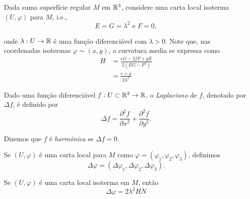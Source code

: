 Dada suma superfície regular $M$ em $\mathbb{R}^3$, considere uma carta local isoterma $(U,\varphi)$ para $M$, i.e., 
\begin{equation*}
	E = G = \lambda^2 \text{ e } F=0,
\end{equation*}

onde $\lambda: U \rightarrow \mathbb{R}$ é uma função diferenciável com $\lambda > 0$. Note que, nas coordenadas isotermas $\varphi \sim (x,y)$, a curvatura media se expressa como
\begin{align*}
	H &= \frac{eG - 2fF + gE}{2(EG - F^2)}\\
	&= \frac{e + g}{2 \lambda^2}
\end{align*}

\begin{defi}
	Dado uma função diferenciável $f: U \subset \mathbb{R}^2 \rightarrow \mathbb{R}$, o \emph{Laplaciano} de $f$, denotado por $\Delta f$, é definido por
	\begin{equation*}
		\Delta f = \frac{\partial^2 f}{\partial x^2} + \frac{\partial^2 f}{\partial y^2}.
	\end{equation*}
	
	Dizemos que $f$ é \emph{harmônica} se $\Delta f = 0$.
	
	Se $(U, \varphi)$ é uma carta local para $M$ como $\varphi = (\varphi_1, \varphi_2, \varphi_3)$, definimos
	\begin{equation*}
		\Delta \varphi = (\Delta \varphi_1, \Delta \varphi_2, \Delta \varphi_3).
	\end{equation*}
\end{defi}

\begin{prop}
	Se $(U, \varphi)$ é uma carta local isoterma em $M$, então 
	\begin{equation*}
		\Delta \varphi = 2 \lambda^2 H N
	\end{equation*}
\end{prop}

